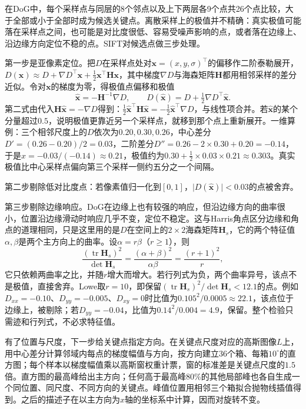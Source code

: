 在DoG中，每个采样点与同层的8个邻点以及上下两层各9个点共26个点比较，大于全部或小于全部时成为候选关键点。离散采样上的极值并不精确：真实极值可能落在采样点之间，也可能是对比度很低、容易受噪声影响的点，或者落在边缘上、沿边缘方向定位不稳的点。SIFT对候选点做三步处理。

第一步是亚像素定位。把$D$在采样点处对$\bm x=(x,y,\sigma)^{\top}$的偏移作二阶泰勒展开，$D(\bm x)\approx D+\nabla D^{\top}\bm x+\tfrac12\bm x^{\top}\bm H\bm x$，其中梯度$\nabla D$与海森矩阵$\bm H$都用相邻采样的差分近似。令对$\bm x$的梯度为零，得极值点偏移和极值
\begin{equation}
  \hat{\bm x}=-\bm H^{-1}\nabla D,\qquad
  D(\hat{\bm x})=D+\tfrac12\nabla D^{\top}\hat{\bm x}.
  \label{eq:vision-features-sift-refine}
\end{equation}
第二式由代入$\bm H\hat{\bm x}=-\nabla D$得到：$\tfrac12\hat{\bm x}^{\top}\bm H\hat{\bm x}=-\tfrac12\hat{\bm x}^{\top}\nabla D$，与线性项合并。若$\hat{\bm x}$的某个分量超过$0.5$，说明极值更靠近另一个采样点，就移到那个点上重新展开。一维算例：三个相邻尺度上的$D$依次为$0.20,0.30,0.26$，中心差分$D'=(0.26-0.20)/2=0.03$，二阶差分$D''=0.26-2\times0.30+0.20=-0.14$，于是$\hat x=-0.03/(-0.14)\approx0.21$，极值约为$0.30+\tfrac12\times0.03\times0.21\approx0.303$。真实极值比中心采样点偏向第三个采样一侧约五分之一个间隔。

第二步剔除低对比度点：若像素值归一化到$[0,1]$，$\lvert D(\hat{\bm x})\rvert<0.03$的点被舍弃。

第三步剔除边缘响应。DoG在边缘上也有较强的响应，但沿边缘方向的曲率很小，位置沿边缘滑动时响应几乎不变，定位不稳定。这与Harris角点区分边缘和角点的道理相同，只是这里用的是$D$在空间上的$2\times2$海森矩阵$\bm H_s$，它的两个特征值$\alpha,\beta$是两个主方向上的曲率。设$\alpha=r\beta$（$r\geq1$），则
\[
  \frac{(\operatorname{tr}\bm H_s)^2}{\det\bm H_s}=\frac{(\alpha+\beta)^2}{\alpha\beta}=\frac{(r+1)^2}{r},
\]
它只依赖两曲率之比，并随$r$增大而增大。若行列式为负，两个曲率异号，该点不是极值，直接舍弃。Lowe取$r=10$，即保留$(\operatorname{tr}\bm H_s)^2/\det\bm H_s<12.1$的点。例如$D_{xx}=-0.10$、$D_{yy}=-0.005$、$D_{xy}=0$时比值为$0.105^2/0.0005\approx22.1$，该点位于边缘上，被剔除；若$D_{yy}=-0.04$，比值为$0.14^2/0.004=4.9$，保留。整个检验只需迹和行列式，不必求特征值。

有了位置与尺度，下一步给关键点指定方向。在关键点尺度对应的高斯图像$L$上，用中心差分计算邻域内每点的梯度幅值与方向，按方向建立36个箱、每箱$10^\circ$的直方图；每个样本以梯度幅值乘以高斯窗权重计票，窗的标准差是关键点尺度的$1.5$倍。直方图的最高峰给出主方向；任何高于最高峰$80\%$的其他局部峰也各自生成一个同位置、同尺度、不同方向的关键点。峰值位置用相邻三个箱拟合抛物线插值得到。之后的描述子在以主方向为$x$轴的坐标系中计算，因而对旋转不变。

